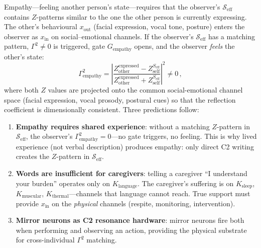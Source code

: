 \documentclass[aps,pre,twocolumn,superscriptaddress,floatfix]{revtex4-2}
\begin{document}
\begin{remark}
\label{rem:empathy}
Empathy---feeling another person's state---requires
that the observer's $\mathcal{S}_{\text{eff}}$ contains
$Z$-patterns similar to the one the other person is
currently expressing.
The other's behavioural $x_{\text{out}}$ (facial
expression, vocal tone, posture) enters the observer as
$x_{\text{in}}$ on social--emotional channels.
If the observer's $\mathcal{S}_{\text{eff}}$ has a
matching pattern, $\Gamma^2 \neq 0$ is triggered,
gate $G_{\text{empathy}}$ opens, and the observer
\emph{feels} the other's state:
\[
  \Gamma^2_{\text{empathy}}
  = \left\lvert
    \frac{Z_{\text{other}}^{\text{expressed}}
         - Z_{\text{self}}^{S_{\text{eff}}}}
         {Z_{\text{other}}^{\text{expressed}}
         + Z_{\text{self}}^{S_{\text{eff}}}}
  \right\rvert^2 \neq 0\,,
\]
where both $Z$ values are projected onto the common
social-emotional channel space (facial expression,
vocal prosody, postural cues) so that the
reflection coefficient is dimensionally consistent.
Three predictions follow:
\begin{enumerate}
  \item \textbf{Empathy requires shared experience}:
    without a matching $Z$-pattern in
    $\mathcal{S}_{\text{eff}}$, the observer's
    $\Gamma^2_{\text{empathy}} = 0$---no gate
    triggers, no feeling.
    This is why lived experience (not verbal
    description) produces empathy: only direct C2
    writing creates the $Z$-pattern in
    $\mathcal{S}_{\text{eff}}$.
  \item \textbf{Words are insufficient for caregivers}:
    telling a caregiver ``I understand your burden''
    operates only on $K_{\text{language}}$.
    The caregiver's suffering is on
    $K_{\text{sleep}}$, $K_{\text{muscular}}$,
    $K_{\text{thermal}}$---channels that language
    cannot reach.
    True support must provide $x_{\text{in}}$ on
    the \emph{physical} channels (respite, monitoring,
    intervention).
  \item \textbf{Mirror neurons as C2 resonance hardware}:
    mirror neurons fire both when performing and
    observing an action, providing the physical
    substrate for cross-individual $\Gamma^2$ matching.
\end{enumerate}
\end{remark}
\end{document}
